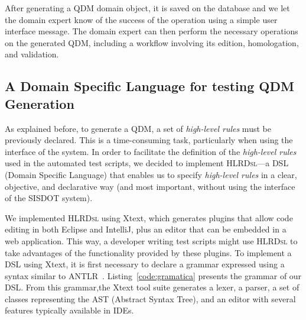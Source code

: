\documentclass{bmcart}
\newcommand{\callers}{\emph{high-level rules}\xspace}
\newcommand{\hlrdsl}{\textsc{HLRDsl}\xspace}
\begin{document}
After generating a QDM domain object, it is saved on the database and we let the domain expert know of the success of the operation using a simple user interface message. The domain expert can then perform the necessary operations on the generated QDM, including a workflow involving  its edition, homologation, and validation.  



\subsection*{A Domain Specific Language for testing QDM Generation}
As explained before, to generate a QDM, a set of \callers must be previously declared. This is a time-consuming task, particularly when using the interface of the system. In order to facilitate the definition of the \callers used in the automated test scripts, we 
decided to implement \hlrdsl---a DSL (Domain Specific Language) that enables us to specify \callers in a clear, objective, and declarative way (and most important, without using the interface of the SISDOT system). 

We implemented \hlrdsl  using Xtext, which generates plugins that allow code editing in both Eclipse and IntelliJ, plus an editor that can be embedded in a web application. This way, a developer writing test scripts might use \hlrdsl to take advantages of the functionality provided by these plugins. To implement a DSL using Xtext, it is first necessary to declare a grammar expressed
using a syntax similar to ANTLR~\cite{parr2013}. Listing~\ref{code:gramatica} presents the grammar of our DSL. From this grammar,the Xtext tool suite generates a lexer, a parser, a set of classes representing the AST (Abstract Syntax Tree), and an editor with several features typically available in IDEs.

\end{document}
